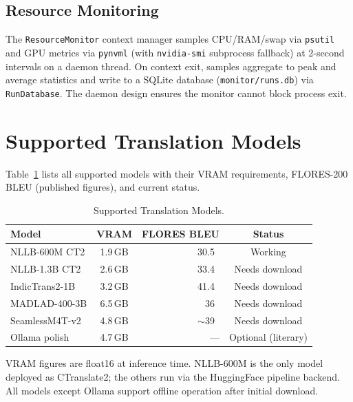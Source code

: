 \documentclass[journal]{IEEEtran}
\newcommand{\MADLADBLEU}{36}
\newcommand{\SEAMLESSBLEU}{39}
\begin{document}
\subsection{Resource Monitoring}

The \texttt{ResourceMonitor} context manager samples CPU/RAM/swap via \texttt{psutil}
and GPU metrics via \texttt{pynvml} (with \texttt{nvidia-smi} subprocess fallback)
at 2-second intervals on a daemon thread.
On context exit, samples aggregate to peak and average statistics and write to a
SQLite database (\texttt{monitor/runs.db}) via \texttt{RunDatabase}.
The daemon design ensures the monitor cannot block process exit.

\section{Supported Translation Models}
\label{sec:models}

Table~\ref{tab:models} lists all supported models with their VRAM requirements,
FLORES-200 BLEU (published figures), and current status.

\begin{table}[htbp]
\caption{Supported Translation Models.}
\label{tab:models}
\centering
\small
\begin{tabular}{p{2.6cm} c r c}
\toprule
Model & VRAM & FLORES BLEU & Status \\
\midrule
NLLB-600M CT2 & 1.9\,GB & 30.5~\cite{nllb2022} & Working \\
NLLB-1.3B CT2 & 2.6\,GB & 33.4~\cite{nllb2022} & Needs download \\
IndicTrans2-1B & 3.2\,GB & 41.4~\cite{gala2023indictrans2} & Needs download \\
MADLAD-400-3B & 6.5\,GB & \MADLADBLEU~\cite{kudugunta2023madlad} & Needs download \\
SeamlessM4T-v2 & 4.8\,GB & $\sim$\SEAMLESSBLEU~\cite{seamlessm4t2023} & Needs download \\
Ollama polish & 4.7\,GB & --- & Optional (literary) \\
\bottomrule
\end{tabular}
\end{table}

VRAM figures are float16 at inference time.
NLLB-600M is the only model deployed as CTranslate2; the others run via the
HuggingFace pipeline backend.
All models except Ollama support offline operation after initial download.
\end{document}
